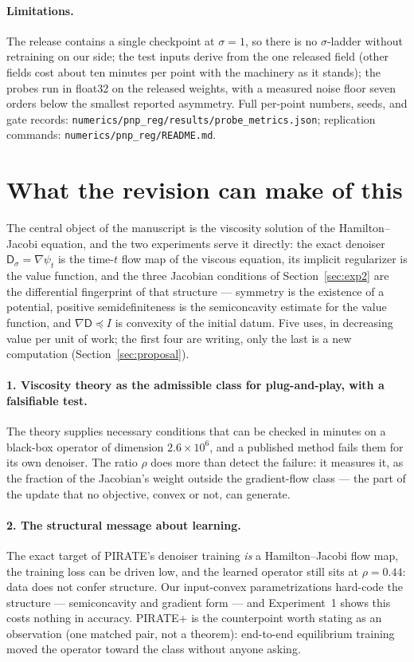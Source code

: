 \documentclass[11pt]{article}
\newcommand{\D}{\mathsf{D}}
\begin{document}
\paragraph{Limitations.} The release contains a single checkpoint at $\sigma = 1$, so there is no $\sigma$-ladder without retraining on our side; the test inputs derive from the one released field (other fields cost about ten minutes per point with the machinery as it stands); the probes run in float32 on the released weights, with a measured noise floor seven orders below the smallest reported asymmetry. Full per-point numbers, seeds, and gate records: \texttt{numerics/pnp\_reg/results/probe\_metrics.json}; replication commands: \texttt{numerics/pnp\_reg/README.md}.

\section{What the revision can make of this}
\label{sec:moves}

The central object of the manuscript is the viscosity solution of the Hamilton--Jacobi equation, and the two experiments serve it directly: the exact denoiser $\D_\sigma = \nabla\psi_t$ is the time-$t$ flow map of the viscous equation, its implicit regularizer is the value function, and the three Jacobian conditions of Section~\ref{sec:exp2} are the differential fingerprint of that structure --- symmetry is the existence of a potential, positive semidefiniteness is the semiconcavity estimate for the value function, and $\nabla\D \preceq I$ is convexity of the initial datum. Five uses, in decreasing value per unit of work; the first four are writing, only the last is a new computation (Section~\ref{sec:proposal}).

\paragraph{1. Viscosity theory as the admissible class for plug-and-play, with a falsifiable test.} The theory supplies necessary conditions that can be checked in minutes on a black-box operator of dimension $2.6 \times 10^6$, and a published method fails them for its own denoiser. The ratio $\rho$ does more than detect the failure: it measures it, as the fraction of the Jacobian's weight outside the gradient-flow class --- the part of the update that no objective, convex or not, can generate.

\paragraph{2. The structural message about learning.} The exact target of PIRATE's denoiser training \emph{is} a Hamilton--Jacobi flow map, the training loss can be driven low, and the learned operator still sits at $\rho = 0.44$: data does not confer structure. Our input-convex parametrizations hard-code the structure --- semiconcavity and gradient form --- and Experiment~1 shows this costs nothing in accuracy. PIRATE+ is the counterpoint worth stating as an observation (one matched pair, not a theorem): end-to-end equilibrium training moved the operator toward the class without anyone asking.
\end{document}
